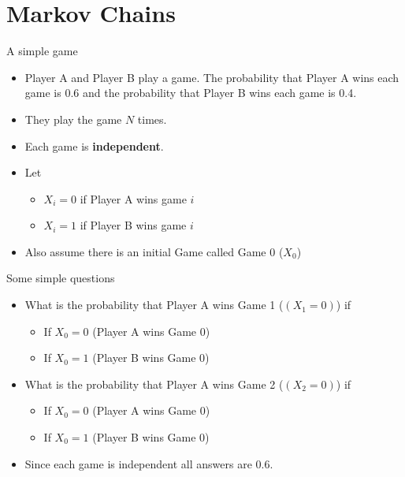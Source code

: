 \documentclass[10pt]{beamer}
\begin{document}
\section{Markov Chains}
\begin{frame}{A simple game}
\begin{itemize}
\item Player A and Player B play a game.  The probability that Player A wins each game is 0.6 and the probability that Player B wins each game is 0.4.
\item They play the game $N$ times.
\item Each game is {\bf independent}.
\item Let

\begin{itemize}
\item $X_i=0$ if Player A wins game $i$
\item $X_i=1$ if Player B wins game $i$
\end{itemize}

\item Also assume there is an initial Game called Game 0 ($X_0$)
\end{itemize}
\end{frame}
\begin{frame}{Some simple questions}
\begin{itemize}
\item What is the probability that Player A wins  Game 1 ($(X_1=0)$) if

\begin{itemize}
\item If $X_0=0$ (Player A wins Game 0)

\item If $X_0=1$ (Player B wins Game 0)
\end{itemize}

\item What is the probability that Player A wins Game 2 ($(X_2=0)$) if

\begin{itemize}
\item If $X_0=0$ (Player A wins Game 0)

\item If $X_0=1$ (Player B wins Game 0)
\end{itemize}

\item Since each game is independent all answers are 0.6.
\end{itemize}
\end{frame}
\end{document}
